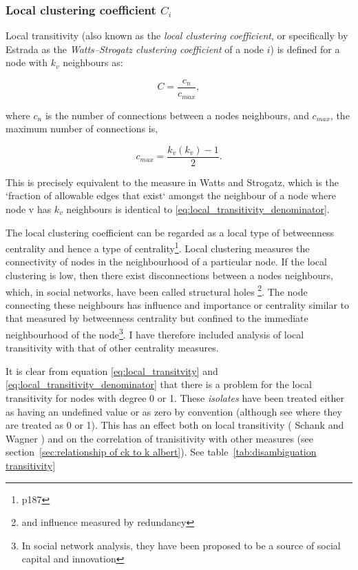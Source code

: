 \subsubsection{Local clustering coefficient $C_i$}
\label{sec:local clustering coefficient}
Local transitivity (also known as the \textit{local clustering coefficient}, or specifically by Estrada\cite{estrada2016local} as the \textit{Watts–Strogatz clustering coefficient} of a node $i$) is defined for a node with $k_v$ neighbours as: 

\begin{equation}
C = \frac{c_n}{c_{max}},
\label{eq:local_transitvity}
\end{equation}


where $c_n$ is the number of connections between a nodes neighbours, and $c_{max}$, the maximum number of connections is, 

\begin{equation}
c_{max} = \frac{k_v(k_v)-1}{2}.
\label{eq:local_transitivity_denominator}
\end{equation}


This \cite{newman2018networks} is precisely equivalent to the measure in Watts and Strogatz, which is the `fraction of allowable edges that exist` amongst the neighbour of a node where node v has $k_v$ neighbours is identical to \ref{eq:local_transitivity_denominator}.

The local clustering coefficient can be regarded as a local type of betweenness centrality and hence a type of centrality\cite{newman2018networks}\footnote{p187}. Local clustering measures the connectivity of nodes in the neighbourhood of a particular node. If the local clustering is low, then there exist disconnections between a nodes neighbours, which, in social networks, have been called structural holes \cite{burt2009structural}\footnote{and influence measured by redundancy}. The node connecting these neighbours has influence and importance or centrality similar to that measured by betweenness centrality but confined to the immediate neighbourhood of the node\footnote{In social network analysis, they have been proposed to be a source of social capital and innovation}. I have therefore included analysis of local transitivity with that of other centrality measures. 

It is clear from equation \ref{eq:local_transitvity} and \ref{eq:local_transitivity_denominator} that there is a problem for the local transitivity for nodes with degree 0 or 1. These \textit{isolates} have been treated either as having an undefined value or as zero by convention (although see \cite{schank2005approximating} where they are treated as 0 or 1). This has an effect both on local transitivity ( Schank and Wagner \cite{schank2005approximating}) and on the correlation of tranisitivity with other measures (see section~\ref{sec:relationship of ck to k albert}). See table~\ref{tab:disambiguation transitivity}



